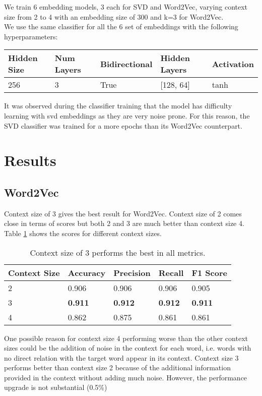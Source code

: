 \documentclass[a4paper,9pt]{report}
\begin{document}
We train 6 embedding models, 3 each for SVD and Word2Vec, varying context size from 2 to 4 with an embedding size of 300 and k=3 for Word2Vec.
\\
We use the same classifier for all the 6 set of embeddings with the following hyperparameters:
\begin{table}[H]
    \centering
    \begin{tabular}{|l|l|l|l|l|}
        \hline
        \textbf{Hidden Size} & \textbf{Num Layers} & \textbf{Bidirectional} & \textbf{Hidden Layers} & \textbf{Activation} \\ \hline
        256 & 3 & True & [128, 64] & tanh \\ \hline
    \end{tabular}
\end{table}
It was observed during the classifier training that the model has difficulty learning with svd embeddings as they are very noise prone. For this reason, the SVD classifier was trained for a more epochs than its Word2Vec counterpart.

\section*{Results}
\subsection*{Word2Vec}
Context size of 3 gives the best result for Word2Vec. 
Context size of 2 comes close in terms of scores but both 2 and 3 are much better than context size 4.
Table \ref{tab:word2vec} shows the scores for different context sizes.
\begin{table}[H]
    \centering
    \begin{tabular}{|l|l|l|l|l|}
        \hline
        \textbf{Context Size} & \textbf{Accuracy} & \textbf{Precision} & \textbf{Recall} & \textbf{F1 Score} \\ \hline
        2 & 0.906 & 0.906 & 0.906 & 0.905 \\
        3 & \textbf{0.911} & \textbf{0.912} & \textbf{0.912} & \textbf{0.911} \\
        4 & 0.862 & 0.875 & 0.861 & 0.861 \\
        \hline
    \end{tabular}
    \caption{Context size of 3 performs the best in all metrics.}
    \label{tab:word2vec}
\end{table} 
One possible reason for context size 4 performing worse than the other context sizes could be the addition of noise in the context for each word, i.e. words with no direct relation with the target word appear in its context. 
Context size 3 performs better than context size 2 because of the additional information provided in the context without adding much noise. However, the performance upgrade is not substantial (0.5\%)
\end{document}

